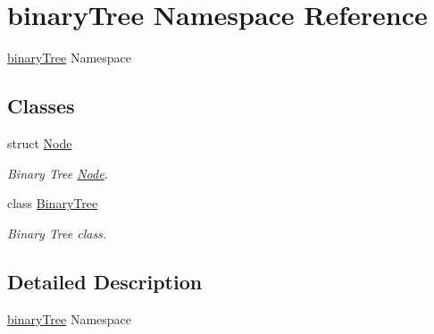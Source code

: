 \hypertarget{namespacebinaryTree}{\section{binary\-Tree Namespace Reference}
\label{namespacebinaryTree}
}


\hyperlink{namespacebinaryTree}{binary\-Tree} Namespace  


\subsection*{Classes}
\begin{DoxyCompactItemize}
\item 
struct \hyperlink{structbinaryTree_1_1Node}{Node}
\begin{DoxyCompactList}\small\item\em Binary Tree \hyperlink{structbinaryTree_1_1Node}{Node}. \end{DoxyCompactList}\item 
class \hyperlink{classbinaryTree_1_1BinaryTree}{Binary\-Tree}
\begin{DoxyCompactList}\small\item\em Binary Tree class. \end{DoxyCompactList}\end{DoxyCompactItemize}


\subsection{Detailed Description}
\hyperlink{namespacebinaryTree}{binary\-Tree} Namespace 